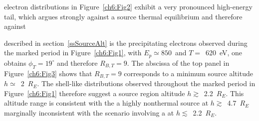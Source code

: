   \DIFdelbegin {}\DIFdelend %
\DIFaddbegin 

  \DIFaddend electron distributions in Figure~\ref{ch6:Fig2} exhibit a
  very pronounced high-energy tail, which argues strongly against a source \DIFdelbegin {}\DIFdelend \DIFaddbegin {}\DIFaddend thermal equilibrium and therefore against \DIFdelbegin {}%

\DIFdelend \DIFaddbegin {}\DIFaddend described in section~\ref{ssSourceAlt} is \DIFdelbegin {}\DIFdelend \DIFaddbegin {}\DIFaddend the precipitating electrons observed during the marked
  period in Figure~\ref{ch6:Fig1}, with $E_p \simeq 850$~\DIFdelbegin {}\DIFdelend \DIFaddbegin {}\DIFaddend and $T =$~620~eV,
  one obtains $\phi_T = 19^\circ$ and therefore $R_{B,T} = 9$. The abscissa of
  the top panel in Figure~\ref{ch6:Fig3} shows that $R_{B,T} = 9$ corresponds to
  a minimum source altitude $h \simeq$~2~$R_E$. The shell-like distributions
  observed throughout the marked period in Figure~\ref{ch6:Fig1} therefore
  suggest a source region altitude $h \gtrsim$~2.2~$R_E$. This altitude range is
  consistent with the \DIFdelbegin {}\DIFdelend \DIFaddbegin {}\DIFaddend a highly nonthermal
  source at $h \gtrsim$~4.7~$R_E$\DIFdelbegin {}\DIFdelend \DIFaddbegin {}\DIFaddend marginally inconsistent with the
  \DIFaddbegin {}\DIFaddend scenario involving a \DIFdelbegin {}\DIFdelend \DIFaddbegin {}\DIFaddend at $h \lesssim$~2.2~$R_E$.

